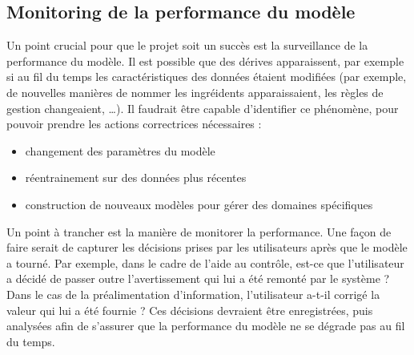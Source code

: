             \subsection{Monitoring de la performance du modèle}

            Un point crucial pour que le projet soit un succès est la surveillance de la performance du modèle.
            Il est possible que des dérives apparaissent, par exemple si au fil du temps les caractéristiques des données étaient modifiées (par exemple, de nouvelles manières de nommer les ingréidents apparaissaient, les règles de gestion changeaient, \dots).
            Il faudrait être capable d'identifier ce phénomène, pour pouvoir prendre les actions correctrices nécessaires : 
            \begin{itemize}
                \item changement des paramètres du modèle
                \item réentrainement sur des données plus récentes
                \item construction de nouveaux modèles pour gérer des domaines spécifiques
            \end{itemize}
            Un point à trancher est la manière de monitorer la performance.
            Une façon de faire serait de capturer les décisions prises par les utilisateurs après que le modèle a tourné.
            Par exemple, dans le cadre de l'aide au contrôle, est-ce que l'utilisateur a décidé de passer outre l'avertissement qui lui a été remonté par le système ?
            Dans le cas de la préalimentation d'information, l'utilisateur a-t-il corrigé la valeur qui lui a été fournie ?
            Ces décisions devraient être enregistrées, puis analysées afin de s'assurer que la performance du modèle ne se dégrade pas au fil du temps.
            

